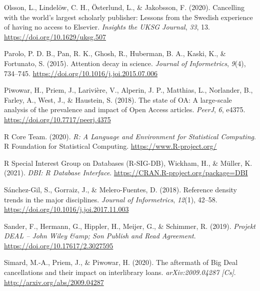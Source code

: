 \documentclass[
]{article}
\newlength{\cslhangindent}
\newlength{\cslentryspacingunit} %
\newenvironment{CSLReferences}[2] %
 {%
  \setlength{\parindent}{0pt}
  \ifodd #1
  \let\oldpar\par
  \def\par{\hangindent=\cslhangindent\oldpar}
  \fi
  \setlength{\parskip}{#2\cslentryspacingunit}
 }%
 {}
\begin{document}
\begin{CSLReferences}{1}{0}
\leavevmode{}%
Olsson, L., Lindelöw, C. H., Österlund, L., \& Jakobsson, F. (2020). Cancelling with the world's largest scholarly publisher: Lessons from the {Swedish} experience of having no access to {Elsevier}. \emph{Insights the UKSG Journal}, \emph{33}, 13. \url{https://doi.org/10.1629/uksg.507}

\leavevmode{}%
Parolo, P. D. B., Pan, R. K., Ghosh, R., Huberman, B. A., Kaski, K., \& Fortunato, S. (2015). Attention decay in science. \emph{Journal of Informetrics}, \emph{9}(4), 734--745. \url{https://doi.org/10.1016/j.joi.2015.07.006}

\leavevmode{}%
Piwowar, H., Priem, J., Larivière, V., Alperin, J. P., Matthias, L., Norlander, B., Farley, A., West, J., \& Haustein, S. (2018). The state of {OA}: A large-scale analysis of the prevalence and impact of {Open} {Access} articles. \emph{PeerJ}, \emph{6}, e4375. \url{https://doi.org/10.7717/peerj.4375}

\leavevmode{}%
R Core Team. (2020). \emph{R: {A} {Language} and {Environment} for {Statistical} {Computing}}. R Foundation for Statistical Computing. \url{https://www.R-project.org/}

\leavevmode{}%
R Special Interest Group on Databases (R-SIG-DB), Wickham, H., \& Müller, K. (2021). \emph{{DBI}: {R} {Database} {Interface}}. \url{https://CRAN.R-project.org/package=DBI}

\leavevmode{}%
Sánchez-Gil, S., Gorraiz, J., \& Melero-Fuentes, D. (2018). Reference density trends in the major disciplines. \emph{Journal of Informetrics}, \emph{12}(1), 42--58. \url{https://doi.org/10.1016/j.joi.2017.11.003}

\leavevmode{}%
Sander, F., Hermann, G., Hippler, H., Meijer, G., \& Schimmer, R. (2019). \emph{Projekt {DEAL} -- {John} {Wiley} \&amp; {Son} {Publish} and {Read} {Agreement}}. \url{https://doi.org/10.17617/2.3027595}

\leavevmode{}%
Simard, M.-A., Priem, J., \& Piwowar, H. (2020). The aftermath of {Big} {Deal} cancellations and their impact on interlibrary loans. \emph{arXiv:2009.04287 {[}Cs{]}}. \url{http://arxiv.org/abs/2009.04287}


\end{CSLReferences}
\end{document}
